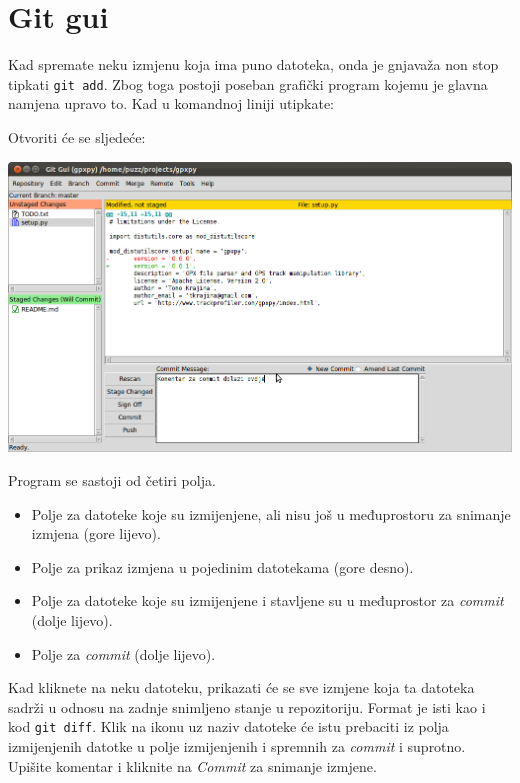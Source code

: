\section*{Git gui}

Kad spremate neku izmjenu koja ima puno datoteka, onda je gnjavaža non stop tipkati \verb+git add+.
Zbog toga postoji poseban grafički program kojemu je glavna namjena upravo to.
Kad u komandnoj liniji utipkate:


Otvoriti će se sljedeće:

\includegraphics[width=14cm]{images/git-gui.png}

Program se sastoji od četiri polja. 

\begin{itemize}
	\item Polje za datoteke koje su izmijenjene, ali nisu još u međuprostoru za snimanje izmjena (gore lijevo).
	\item Polje za prikaz izmjena u pojedinim datotekama (gore desno). 
	\item Polje za datoteke koje su izmijenjene i stavljene su u međuprostor za \emph{commit} (dolje lijevo).
	\item Polje za \emph{commit} (dolje lijevo).
\end{itemize}

Kad kliknete na neku datoteku, prikazati će se sve izmjene koja ta datoteka sadrži u odnosu na zadnje snimljeno stanje u repozitoriju.
Format je isti kao i kod \verb+git diff+.
Klik na ikonu uz naziv datoteke će istu prebaciti iz polja izmijenjenih datotke u polje izmijenjenih i spremnih za \emph{commit} i suprotno.
Upišite komentar i kliknite na \emph{Commit} za snimanje izmjene.

